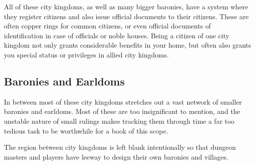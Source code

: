 All of these city kingdoms, as well as many bigger baronies, have a system
where they register citizens and also issue official documents to their
citizens. These are often copper rings for common citizens, or even official
documents of identification in case of officials or noble houses. Being a
citizen of one city kingdom not only grants considerable benefits in your
home, but often also grants you special status or privileges in allied city
kingdoms.

\subsection{Baronies and Earldoms}


In between most of these city kingdoms stretches out a vast network of smaller
baronies and earldoms. Most of these are too insignificant to mention, and the
unstable nature of small rulings makes tracking them through time a far too
tedious task to be worthwhile for a book of this scope.

\begin{note}
  The region between city kingdoms is left blank intentionally so that dungeon
  masters and players have leeway to design their own baronies and villages.
\end{note}













